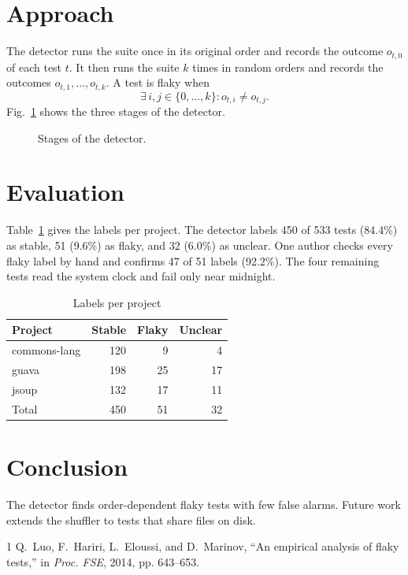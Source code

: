 \documentclass[10pt,conference,letterpaper]{IEEEtran}
\begin{document}
\section{Approach}
The detector runs the suite once in its original order and records the outcome
$o_{t,0}$ of each test $t$. It then runs the suite $k$ times in random orders and records the
outcomes $o_{t,1}, \dots, o_{t,k}$. A test is flaky when
\begin{equation}
\exists\, i, j \in \{0, \dots, k\} : o_{t,i} \neq o_{t,j}.
\end{equation}
Fig.~\ref{fig:pipeline} shows the three stages of the detector.

\begin{figure}[t]
\centering
{}
\caption{Stages of the detector.}
\label{fig:pipeline}
\end{figure}

\section{Evaluation}
Table~\ref{tab:results} gives the labels per project. The detector labels 450 of 533 tests
(84.4\%) as stable, 51 (9.6\%) as flaky, and 32 (6.0\%) as unclear. One author checks every
flaky label by hand and confirms 47 of 51 labels (92.2\%). The four remaining tests read the
system clock and fail only near midnight.

\begin{table}[t]
\caption{Labels per project}
\label{tab:results}
\centering
\begin{tabular}{lrrr}
\hline
Project & Stable & Flaky & Unclear \\
\hline
commons-lang & 120 & 9 & 4 \\
guava & 198 & 25 & 17 \\
jsoup & 132 & 17 & 11 \\
\hline
Total & 450 & 51 & 32 \\
\hline
\end{tabular}
\end{table}

\section{Conclusion}
The detector finds order-dependent flaky tests with few false alarms. Future work extends
the shuffler to tests that share files on disk.

\begin{thebibliography}{1}
Q.~Luo, F.~Hariri, L.~Eloussi, and D.~Marinov, ``An empirical analysis of flaky tests,''
in \emph{Proc. FSE}, 2014, pp. 643--653.
\end{thebibliography}
\end{document}
